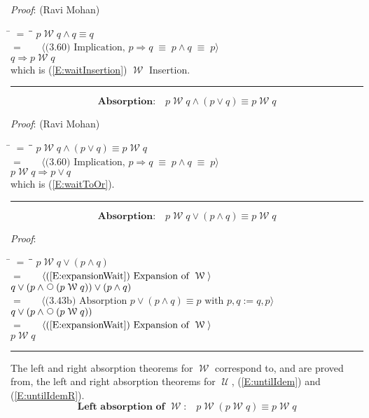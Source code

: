 \documentclass[12pt, fleqn, leqno]{article}
\newcommand{\lgap}{2pt}                             %
\newcommand{\mymathindent}{24pt}                    %
\newcommand{\equivs}{\ensuremath{\;\equiv\;}}       %
\newcommand{\impl}{\ensuremath{\Rightarrow}}        %
\newcommand{\Until}{\;\mathcal{U}\;}
\newcommand{\Wait}{\;\mathcal{W}\;}
\newcommand{\Next}{\;\,\text{\raisebox{3.5pt}{\circle{6}}}}
\newcommand{\myqed}{\rule[-.23ex]{1.2ex}{2.0ex}}
\newcommand{\myqedtab}{\hspace{384pt}}              %
\newcommand{\Gll} {\langle}                         %
\newcommand{\Ggg} {\rangle}                         %
\newcommand{\Hint}[1]     {\ \ \ $\Gll              \mbox{#1} \Ggg$ }   %
\begin{document}
\emph{Proof}: (Ravi Mohan)
\begin{tabbing}
\hspace{\mymathindent} \= $= \;$ \= \myqedtab \= \kill
\> \> $p\Wait q\land q\equiv q$\\[\lgap]
\> $=$  \>  \Hint{(3.60) Implication, $p\impl q \equivs p\land q \equivs p$}\\[\lgap]
\> \> $q\impl p\Wait q$\\[\lgap]
\> which is (\ref{E:waitInsertion}) $\Wait$ Insertion. \quad \myqed
\end{tabbing}
\begin{equation}\label{E:waitAndOr}
\textbf{Absorption:}\quad p\Wait q\land (p\lor q) \equiv p\Wait q
\end{equation}

\emph{Proof}: (Ravi Mohan)
\begin{tabbing}
\hspace{\mymathindent} \= $= \;$ \= \myqedtab \= \kill
\> \> $p\Wait q\land (p\lor q) \equiv p\Wait q$\\[\lgap]
\> $=$  \>  \Hint{(3.60) Implication, $p\impl q \equivs p\land q \equivs p$}\\[\lgap]
\> \> $p\Wait q\impl p\lor q$\\[\lgap]
\> which is (\ref{E:waitToOr}). \quad \myqed
\end{tabbing}
\begin{equation}\label{E:waitOrAnd}
\textbf{Absorption:}\quad p\Wait q\lor (p\land q) \equiv p\Wait q
\end{equation}

\emph{Proof}:
\begin{tabbing}
\hspace{\mymathindent} \= $= \;$ \= \myqedtab \= \kill
\> \> $p\Wait q\lor (p\land q)$\\[\lgap]
\> $=$ \> \Hint{(\ref{E:expansionWait}) Expansion of $\Wait$} \\[\lgap]
\> \> $q\lor (p\land \Next (p\Wait q)) \lor (p\land q)$\\[\lgap]
  \> $=$  \>  \Hint{(3.43b) Absorption $p \lor (p \land q) \equiv p$ with $p,q:=q,p$}\\[\lgap]
\> \> $q\lor (p\land \Next (p\Wait q))$\\[\lgap]
\> $=$ \> \Hint{(\ref{E:expansionWait}) Expansion of $\Wait$} \\[\lgap]
\> \> $p\Wait q$ \quad \myqed
\end{tabbing}

The left and right absorption theorems for $\Wait$ correspond to, and are proved from, the left and right absorption theorems
for $\Until$, (\ref{E:untilIdem}) and (\ref{E:untilIdemR}).
\begin{equation}\label{E:waitAbsL}
\textbf{Left absorption of $\Wait$:}\quad p \Wait (p \Wait q) \equiv p \Wait q
\end{equation}
\end{document}
